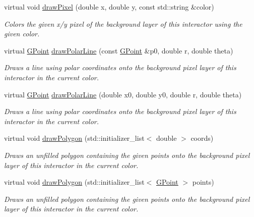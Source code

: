 \begin{DoxyCompactItemize}
virtual void \mbox{\hyperlink{classsgl_1_1GDrawingSurface_a20abc26a94b7eb310e34abf668e0f5f4}{draw\+Pixel}} (double x, double y, const std\+::string \&color)
\begin{DoxyCompactList}\small\item\em Colors the given x/y pixel of the background layer of this interactor using the given color. \end{DoxyCompactList}\item 
virtual \mbox{\hyperlink{structsgl_1_1GPoint}{G\+Point}} \mbox{\hyperlink{classsgl_1_1GDrawingSurface_af70cce1e4f708f1ed5b6f29cecb660e7}{draw\+Polar\+Line}} (const \mbox{\hyperlink{structsgl_1_1GPoint}{G\+Point}} \&p0, double r, double theta)
\begin{DoxyCompactList}\small\item\em Draws a line using polar coordinates onto the background pixel layer of this interactor in the current color. \end{DoxyCompactList}\item 
virtual \mbox{\hyperlink{structsgl_1_1GPoint}{G\+Point}} \mbox{\hyperlink{classsgl_1_1GDrawingSurface_ad3e646f90005295f2bbdf37d2bcb39d2}{draw\+Polar\+Line}} (double x0, double y0, double r, double theta)
\begin{DoxyCompactList}\small\item\em Draws a line using polar coordinates onto the background pixel layer of this interactor in the current color. \end{DoxyCompactList}\item 
virtual void \mbox{\hyperlink{classsgl_1_1GDrawingSurface_afddec0a905108d8a8d6809a157f26776}{draw\+Polygon}} (std\+::initializer\+\_\+list$<$ double $>$ coords)
\begin{DoxyCompactList}\small\item\em Draws an unfilled polygon containing the given points onto the background pixel layer of this interactor in the current color. \end{DoxyCompactList}\item 
virtual void \mbox{\hyperlink{classsgl_1_1GDrawingSurface_a021ee881e0d154dc4dd059698742889c}{draw\+Polygon}} (std\+::initializer\+\_\+list$<$ \mbox{\hyperlink{structsgl_1_1GPoint}{G\+Point}} $>$ points)
\begin{DoxyCompactList}\small\item\em Draws an unfilled polygon containing the given points onto the background pixel layer of this interactor in the current color. \end{DoxyCompactList}\item 

\end{DoxyCompactItemize}
